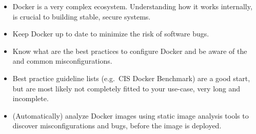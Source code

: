 \begin{itemize}
    \item Docker is a very complex ecosystem. Understanding how it works internally, is crucial to building stable, secure systems.

    \item Keep Docker up to date to minimize the risk of software bugs.

    \item Know what are the best practices to configure Docker and be aware of the and common misconfigurations.

    \item Best practice guideline lists (e.g.\ CIS Docker Benchmark) are a good start, but are most likely not completely fitted to your use-case, very long and incomplete.

    \item (Automatically) analyze Docker images using static image analysis tools to discover misconfigurations and bugs, before the image is deployed.
\end{itemize}
